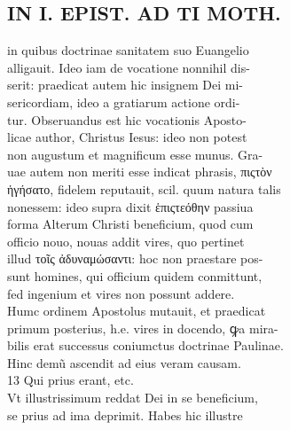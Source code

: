 \documentclass{article}
\begin{document}
\begin{pages}
\section*{IN I. EPIST. AD TI MOTH. \\
                }
in quibus doctrinae sanitatem suo Euangelio \\
                alligauit. Ideo iam de vocatione nonnihil dis- \\
                serit: praedicat autem hic insignem Dei mi- \\
                sericordiam, ideo a gratiarum actione ordi- \\
                tur. Obseruandus est hic vocationis Aposto- \\
                licae author, Christus Iesus: ideo non potest \\
                non augustum et magnificum esse munus. Gra- \\
                uae autem non meriti esse indicat phrasis, πιςτὸν \\
                ἡγήσατο, fidelem reputauit, scil. quum natura talis \\
                nonessem: ideo supra dixit ἑπιςτεόθην passiua \\
                forma Alterum Christi beneficium, quod cum \\
                officio nouo, nouas addit vires, quo pertinet \\
                illud τοῖς ἀδυναμώσαντι: hoc non praestare pos- \\
                sunt homines, qui officium quidem conmittunt, \\
                fed ingenium et vires non possunt addere. \\
                Humc ordinem Apostolus mutauit, et praedicat \\
                primum posterius, h.e. vires in docendo, ꝙa mira- \\
                bilis erat successus coniumctus doctrinae Paulinae. \\
                Hinc demũ ascendit ad eius veram causam. \\
                13 Qui prius erant, etc. \\
                Vt illustrissimum reddat Dei in se beneficium, \\
                se prius ad ima deprimit. Habes hic illustre \\

\end{pages}
\end{document}
